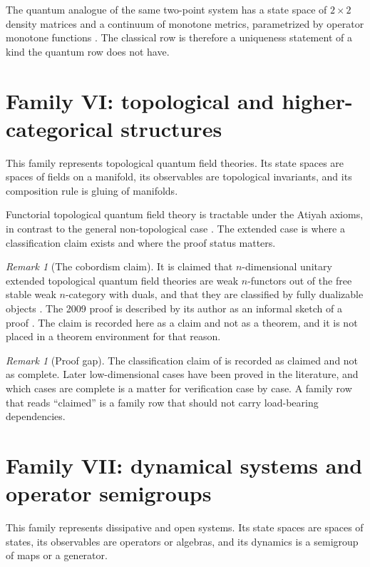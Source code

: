 \documentclass[11pt,letterpaper]{article}
\theoremstyle{definition}
\theoremstyle{remark}
\newtheorem{remark}[theorem]{Remark}
\begin{document}
The quantum analogue of the same two-point system has a state space of $2 \times 2$ density matrices and a continuum of monotone metrics, parametrized by operator monotone functions \cite{petz}. The classical row is therefore a uniqueness statement of a kind the quantum row does not have.

\section{Family VI: topological and higher-categorical structures}
\label{sec:family6}

This family represents topological quantum field theories. Its state spaces are spaces of fields on a manifold, its observables are topological invariants, and its composition rule is gluing of manifolds.

Functorial topological quantum field theory is tractable under the Atiyah axioms, in contrast to the general non-topological case \cite{tqft}. The extended case is where a classification claim exists and where the proof status matters.

\begin{remark}[The cobordism claim]
\label{rem:cobordism}
It is claimed that $n$-dimensional unitary extended topological quantum field theories are weak $n$-functors out of the free stable weak $n$-category with duals, and that they are classified by fully dualizable objects \cite{baezdolan,lurie}. The 2009 proof is described by its author as an informal sketch of a proof \cite{lurie}. The claim is recorded here as a claim and not as a theorem, and it is not placed in a theorem environment for that reason.
\end{remark}

\begin{remark}[Proof gap]
\label{rem:proof-gap}
The classification claim of  is recorded as claimed and not as complete. Later low-dimensional cases have been proved in the literature, and which cases are complete is a matter for verification case by case. A family row that reads ``claimed'' is a family row that should not carry load-bearing dependencies.
\end{remark}

\section{Family VII: dynamical systems and operator semigroups}
\label{sec:family7}

This family represents dissipative and open systems. Its state spaces are spaces of states, its observables are operators or algebras, and its dynamics is a semigroup of maps or a generator.
\end{document}
